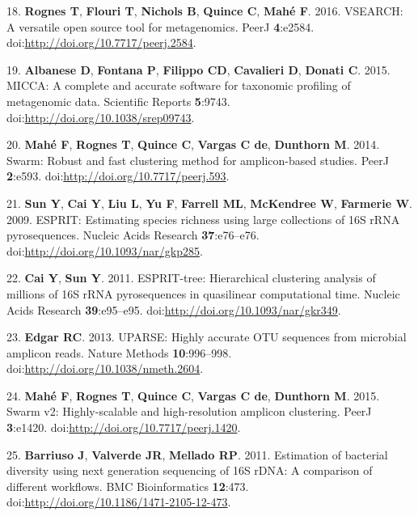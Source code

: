 \documentclass[11pt,]{article}
\begin{document}
18. \textbf{Rognes T}, \textbf{Flouri T}, \textbf{Nichols B},
\textbf{Quince C}, \textbf{Mahé F}. 2016. VSEARCH: A versatile open
source tool for metagenomics. PeerJ \textbf{4}:e2584.
doi:\url{http://doi.org/10.7717/peerj.2584}.

19. \textbf{Albanese D}, \textbf{Fontana P}, \textbf{Filippo CD},
\textbf{Cavalieri D}, \textbf{Donati C}. 2015. MICCA: A complete and
accurate software for taxonomic profiling of metagenomic data.
Scientific Reports \textbf{5}:9743.
doi:\url{http://doi.org/10.1038/srep09743}.

20. \textbf{Mahé F}, \textbf{Rognes T}, \textbf{Quince C},
\textbf{Vargas C de}, \textbf{Dunthorn M}. 2014. Swarm: Robust and fast
clustering method for amplicon-based studies. PeerJ \textbf{2}:e593.
doi:\url{http://doi.org/10.7717/peerj.593}.

21. \textbf{Sun Y}, \textbf{Cai Y}, \textbf{Liu L}, \textbf{Yu F},
\textbf{Farrell ML}, \textbf{McKendree W}, \textbf{Farmerie W}. 2009.
ESPRIT: Estimating species richness using large collections of 16S rRNA
pyrosequences. Nucleic Acids Research \textbf{37}:e76--e76.
doi:\url{http://doi.org/10.1093/nar/gkp285}.

22. \textbf{Cai Y}, \textbf{Sun Y}. 2011. ESPRIT-tree: Hierarchical
clustering analysis of millions of 16S rRNA pyrosequences in quasilinear
computational time. Nucleic Acids Research \textbf{39}:e95--e95.
doi:\url{http://doi.org/10.1093/nar/gkr349}.

23. \textbf{Edgar RC}. 2013. UPARSE: Highly accurate OTU sequences from
microbial amplicon reads. Nature Methods \textbf{10}:996--998.
doi:\url{http://doi.org/10.1038/nmeth.2604}.

24. \textbf{Mahé F}, \textbf{Rognes T}, \textbf{Quince C},
\textbf{Vargas C de}, \textbf{Dunthorn M}. 2015. Swarm v2:
Highly-scalable and high-resolution amplicon clustering. PeerJ
\textbf{3}:e1420. doi:\url{http://doi.org/10.7717/peerj.1420}.

25. \textbf{Barriuso J}, \textbf{Valverde JR}, \textbf{Mellado RP}.
2011. Estimation of bacterial diversity using next generation sequencing
of 16S rDNA: A comparison of different workflows. BMC Bioinformatics
\textbf{12}:473. doi:\url{http://doi.org/10.1186/1471-2105-12-473}.
\end{document}
